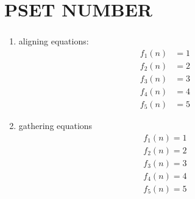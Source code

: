 \documentclass[12pt]{article}
\renewcommand{\psetnum}{NUMBER}
\begin{document}
\setlength{\abovedisplayskip}{6pt}
\setlength{\belowdisplayskip}{6pt}
\setcounter{page}{1}
\thispagestyle{firstpage}
\vspace*{-30pt}

\part*{PSET \psetnum}

\section{}
    \begin{enumerate}
        \item
            aligning equations:
            \begin{align*}
                f_1(n) &= 1 \\
                f_2(n) &= 2 \\
                f_3(n) &= 3 \\
                f_4(n) &= 4 \\
                f_5(n) &= 5
            \end{align*}

        \item
            gathering equations
            \begin{gather*}
                f_1(n) = 1 \\
                f_2(n) = 2 \\
                f_3(n) = 3 \\
                f_4(n) = 4 \\
                f_5(n) = 5
            \end{gather*}

    \end{enumerate}

\pagebreak
\end{document}
